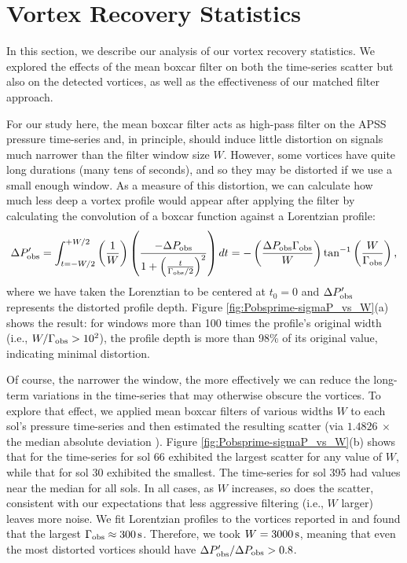\documentclass[linenumbers,trackchanges]{aastex63}
\begin{document}
\appendix

\section{Vortex Recovery Statistics}
\label{sec:Vortex Recovery Statistics}
In this section, we describe our analysis of our vortex recovery statistics. We explored the effects of the mean boxcar filter on both the time-series scatter but also on the detected vortices, as well as the effectiveness of our matched filter approach.

For our study here, the mean boxcar filter  acts as high-pass filter on the APSS pressure time-series and, in principle, should induce little distortion on signals much narrower than the filter window size $W$. However, some vortices have quite long durations (many tens of seconds), and so they may be distorted if we use a small enough window. As a measure of this distortion, we can calculate how much less deep a vortex profile would appear after applying the filter by calculating the convolution of a boxcar function against a Lorentzian profile:
\begin{equation}
    \Delta P_{\rm obs}^\prime = \int_{t = -W/2}^{+W/2} \left( \frac{1}{W} \right) \left( \frac{-\Delta P_{\rm obs}}{1 + \left( \frac{t}{\Gamma_{\rm obs}/2} \right)^2} \right) dt = -\left( \frac{\Delta P_{\rm obs} \Gamma_{\rm obs}}{W}\right) \tan^{-1} \left( \frac{W}{\Gamma_{\rm obs}} \right), \label{eqn:tophat_convolution}
\end{equation}
where we have taken the Lorenztian to be centered at $t_0 = 0$ and $\Delta P_{\rm obs}^\prime$ represents the distorted profile depth. Figure \ref{fig:Pobsprime-sigmaP_vs_W}(a) shows the result: for windows more than 100 times the profile's original width (i.e., $W/\Gamma_{\rm obs} > 10^2$), the profile depth is more than 98\% of its original value, indicating minimal distortion. 

Of course, the narrower the window, the more effectively we can reduce the long-term variations in the time-series that may otherwise obscure the vortices. To explore that effect, we applied mean boxcar filters of various widths $W$ to each sol's pressure time-series and then estimated the resulting scatter (via $1.4826\ \times$ the median absolute deviation \citealp{doi:10.1080/01621459.1993.10476408}). Figure \ref{fig:Pobsprime-sigmaP_vs_W}(b) shows that for the time-series for sol 66 exhibited the largest scatter for any value of $W$, while that for sol 30 exhibited the smallest. The time-series for sol 395 had values near the median for all sols. In all cases, as $W$ increases, so does the scatter, consistent with our expectations that less aggressive filtering (i.e., $W$ larger) leaves more noise. We fit Lorentzian profiles to the vortices reported in \citet{2021JGRE..12606511S} and found that the largest $\Gamma_{\rm obs} \approx 300\,{\rm s}$. Therefore, we took $W = 3000\,{\rm s}$, meaning that even the most distorted vortices should have $\Delta P_{\rm obs}^\prime/\Delta P_{\rm obs} > 0.8$.
\end{document}
